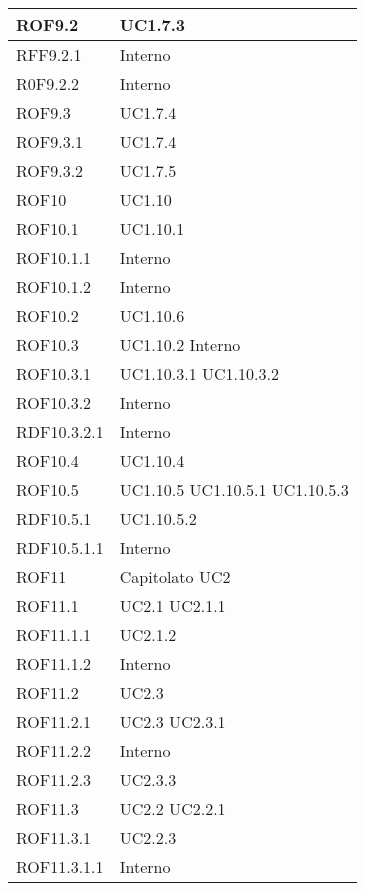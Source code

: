 \begin{center}
\begin{longtable}{| p{4cm} | p{4cm} |}
\hline
ROF9.2   &  UC1.7.3 \\
\hline
RFF9.2.1   &  Interno \\
\hline
R0F9.2.2   &  Interno \\
\hline
ROF9.3   &  UC1.7.4 \\
\hline
ROF9.3.1   &  UC1.7.4 \\
\hline
ROF9.3.2   &  UC1.7.5 \\
\hline
ROF10   &  UC1.10 \\
\hline
ROF10.1   &  UC1.10.1 \\
\hline
ROF10.1.1   &  Interno \\
\hline
ROF10.1.2   &  Interno \\
\hline
ROF10.2   &  UC1.10.6 \\
\hline
ROF10.3   &  UC1.10.2 \newline Interno \\
\hline
ROF10.3.1   &  UC1.10.3.1 \newline UC1.10.3.2 \\
\hline
ROF10.3.2   &  Interno \\
\hline
RDF10.3.2.1   &  Interno \\
\hline
ROF10.4   &  UC1.10.4 \\
\hline
ROF10.5   &  UC1.10.5 \newline UC1.10.5.1 \newline UC1.10.5.3 \\
\hline
RDF10.5.1   &  UC1.10.5.2 \\
\hline
RDF10.5.1.1   &  Interno \\
\hline
ROF11   &  Capitolato \newline UC2 \\
\hline
ROF11.1   &  UC2.1 \newline UC2.1.1 \\
\hline
ROF11.1.1   &  UC2.1.2 \\
\hline
ROF11.1.2   &  Interno \\
\hline
ROF11.2   &  UC2.3  \\
\hline
ROF11.2.1   &  UC2.3 \newline UC2.3.1 \\
\hline
ROF11.2.2   &  Interno \\
\hline
ROF11.2.3   &  UC2.3.3 \\
\hline
ROF11.3   &  UC2.2 \newline UC2.2.1 \\
\hline
ROF11.3.1   &  UC2.2.3 \\
\hline
ROF11.3.1.1   &  Interno \\

\end{longtable}
\end{center}

